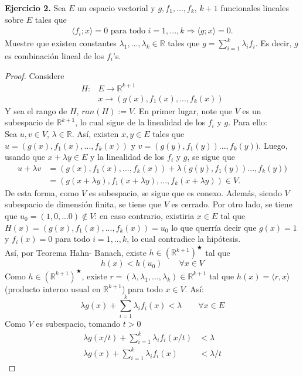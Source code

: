 \textbf{Ejercicio 2.} Sea $E$ un espacio vectorial y $g,f_1,...,f_k$, $k+1$ funcionales lineales sobre $E$ tales que
\begin{align*}
    \langle f_i;x\rangle=0 \text{ para todo } i=1,...,k \Longrightarrow \langle g;x\rangle=0.
\end{align*}
Muestre que existen constantes $\lambda_1,...,\lambda_k\in \mathbb{R}$ tales que $\displaystyle g=\sum_{i=1}^k \lambda_if_i$. Es decir, $g$ es combinación lineal de los $f_i$'s.
\begin{proof}
Considere
\begin{align*}
    H:&E\longrightarrow\mathbb{R}^{k+1} \\&x \longrightarrow(g(x),f_1(x),...,f_k(x))
\end{align*}
Y sea el rango de $H$, $ran(H):=V$. En primer lugar, note que $V$ es un subespacio de $\mathbb{R}^{k+1}$, lo cual sigue de la linealidad de los $f_i$ y $g$. Para ello: \\
\checkmark Sea $u,v \in V$, $\lambda \in \mathbb{R}$. Así, existen $x,y \in E$ tales que $u=(g(x),f_1(x),...,f_k(x))$ y $v=(g(y),f_1(y))...,f_k(y))$. Luego, usando que $x+\lambda y \in E$ y la linealidad de los $f_i$ y $g$, se sigue que 
\begin{align*}
 u+\lambda v&=(g(x),f_1(x),...,f_k(x))+\lambda (g(y),f_1(y))...,f_k(y)) \\ &=(g(x+\lambda y),f_1(x+\lambda y),...,f_k(x+ \lambda y)) \in V.
\end{align*}
De esta forma, como $V$ es subespacio, se sigue que es conexo. Además, siendo $V$ subespacio de dimensión finita, se tiene que $V$ es cerrado. Por otro lado, se tiene que $u_0=(1,0,...0)\notin V$: en caso contrario, existiria $x \in E$ tal que $H(x)=(g(x),f_1(x),...,f_k(x))=u_0$ lo que querría decir que $g(x)=1$ y $f_i(x)=0$ para todo $i=1,..,k$, lo cual contradice la hipótesis. 
\\
Así, por Teorema Hahn- Banach, existe $h \in (\mathbb{R}^{k+1})^\bigstar$ tal que 
\[
h(x)<h(u_0) \qquad \forall x \in V
\]
Como $h\in (\mathbb{R}^{k+1})^\bigstar$, existe $r=(\lambda,\lambda_1,...,\lambda_k)\in \mathbb{R}^{k+1}$ tal que $h(x)=\langle r,x\rangle$ (producto interno usual en $\mathbb{R}^{k+1}$) para todo $x\in V$. Así:
\[
\lambda g(x)+\sum_{i=1}^{k}\lambda_if_i(x)<\lambda \qquad\forall x \in E
\]
Como $V$ es subespacio, tomando $t>0$
\begin{align*}
    \lambda g(x/t)+\sum_{i=1}^{k}\lambda_if_i(x/t)&<\lambda \\
    \lambda g(x)+\sum_{i=1}^{k}\lambda_if_i(x)&<\lambda/t

\end{align*}
\end{proof}
